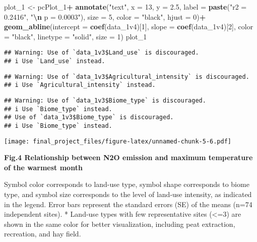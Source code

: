 \documentclass[
]{article}
\newenvironment{Shaded}{\begin{snugshade}}{\end{snugshade}}
\newcommand{\AttributeTok}[1]{\textcolor[rgb]{0.13,0.29,0.53}{#1}}
\newcommand{\DecValTok}[1]{\textcolor[rgb]{0.00,0.00,0.81}{#1}}
\newcommand{\FloatTok}[1]{\textcolor[rgb]{0.00,0.00,0.81}{#1}}
\newcommand{\FunctionTok}[1]{\textcolor[rgb]{0.13,0.29,0.53}{\textbf{#1}}}
\newcommand{\NormalTok}[1]{#1}
\newcommand{\OtherTok}[1]{\textcolor[rgb]{0.56,0.35,0.01}{#1}}
\newcommand{\SpecialCharTok}[1]{\textcolor[rgb]{0.81,0.36,0.00}{\textbf{#1}}}
\newcommand{\StringTok}[1]{\textcolor[rgb]{0.31,0.60,0.02}{#1}}
\begin{document}
\begin{Shaded}
\begin{Highlighting}[]
\NormalTok{plot\_1 }\OtherTok{\textless{}{-}}\NormalTok{ pcPlot\_1}\SpecialCharTok{+}
  \FunctionTok{annotate}\NormalTok{(}\StringTok{"text"}\NormalTok{, }
           \AttributeTok{x =} \DecValTok{13}\NormalTok{, }\AttributeTok{y =} \FloatTok{2.5}\NormalTok{,}
           \AttributeTok{label =} \FunctionTok{paste}\NormalTok{(}\StringTok{"r2 = 0.2416"}\NormalTok{, }\StringTok{"}\SpecialCharTok{\textbackslash{}n}\StringTok{ p = 0.0003"}\NormalTok{), }
           \AttributeTok{size =} \DecValTok{5}\NormalTok{, }\AttributeTok{color =} \StringTok{"black"}\NormalTok{, }\AttributeTok{hjust =} \DecValTok{0}\NormalTok{)}\SpecialCharTok{+}
  \FunctionTok{geom\_abline}\NormalTok{(}\AttributeTok{intercept =} \FunctionTok{coef}\NormalTok{(data\_1v4)[}\DecValTok{1}\NormalTok{], }
              \AttributeTok{slope =} \FunctionTok{coef}\NormalTok{(data\_1v4)[}\DecValTok{2}\NormalTok{], }
              \AttributeTok{color =} \StringTok{"black"}\NormalTok{, }\AttributeTok{linetype =} \StringTok{"solid"}\NormalTok{, }\AttributeTok{size =} \DecValTok{1}\NormalTok{)}
\NormalTok{plot\_1}
\end{Highlighting}
\end{Shaded}

\begin{verbatim}
## Warning: Use of `data_1v3$Land_use` is discouraged.
## i Use `Land_use` instead.
\end{verbatim}

\begin{verbatim}
## Warning: Use of `data_1v3$Agricultural_intensity` is discouraged.
## i Use `Agricultural_intensity` instead.
\end{verbatim}

\begin{verbatim}
## Warning: Use of `data_1v3$Biome_type` is discouraged.
## i Use `Biome_type` instead.
## Use of `data_1v3$Biome_type` is discouraged.
## i Use `Biome_type` instead.
\end{verbatim}

\texttt{[image: final\_project\_files/figure-latex/unnamed-chunk-5-6.pdf]}

\textbf{Fig.4 Relationship between N2O emission and maximum temperature
of the warmest month}

Symbol color corresponds to land-use type, symbol shape corresponds to
biome type, and symbol size corresponds to the level of land-use
intensity, as indicated in the legend. Error bars represent the standard
errors (SE) of the means (n=74 independent sites). * Land-use types with
few representative sites (\textless=3) are shown in the same color for
better visualization, including peat extraction, recreation, and hay
field.
\end{document}
